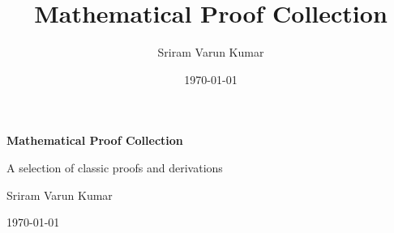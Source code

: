 \documentclass[11pt,a4paper]{article}
\title{\Huge Mathematical Proof Collection}
\author{Sriram Varun Kumar}
\date{\today}
\theoremstyle{plain}
\theoremstyle{definition}
\theoremstyle{remark}
\begin{document}
\begin{titlepage}
    \centering
    \vspace*{3cm}
    {\Huge\bfseries Mathematical Proof Collection\par}
    \vspace{1.5cm}
    {\Large A selection of classic proofs and derivations\par}
    \vspace{2cm}
    {\large Sriram Varun Kumar\par}
    \vfill
    {\large \today\par}
\end{titlepage}

\tableofcontents
\newpage





\end{document}
